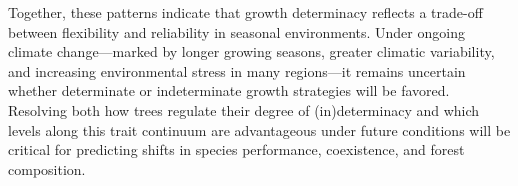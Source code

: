 \documentclass{article}
\begin{document}
Together, these patterns indicate that growth determinacy reflects a trade-off between flexibility and reliability in seasonal environments. Under ongoing climate change—marked by longer growing seasons, greater climatic variability, and increasing environmental stress in many regions—it remains uncertain whether determinate or indeterminate growth strategies will be favored. Resolving both how trees regulate their degree of (in)determinacy and which levels along this trait continuum are advantageous under future conditions will be critical for predicting shifts in species performance, coexistence, and forest composition.								


\end{document}
